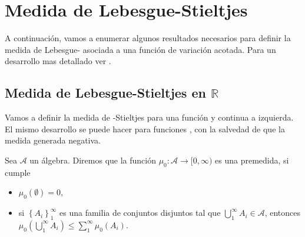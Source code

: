 \section{Medida de Lebesgue-Stieltjes}
A continuación, vamos a enumerar algunos resultados necesarios para definir la medida de Lebesgue- asociada a una función de variación acotada. Para un desarrollo mas detallado ver \cite{folland}.
\subsection{Medida de Lebesgue-Stieltjes en $\mathbb{R}$}
 
Vamos a definir la medida de -Stieltjes para una función  y continua a izquierda. El mismo desarrollo se puede hacer para funciones , con la salvedad de que la medida generada  negativa.


\begin{defi}\label{def:premedida}
Sea $\mathcal{A}$ un álgebra. Diremos que la función $\mu_0:\mathcal{A}\to [0,\infty)$ es una premedida, si cumple 
 
 
\begin{itemize}
    \item $\mu_0(\emptyset)=0,$
    \item si $\displaystyle\left\{A_i\right\}_1^\infty$ es una familia de conjuntos disjuntos tal que $\displaystyle\bigcup_1^\infty A_i\in \mathcal{A}$, entonces $\displaystyle\mu_0\left(\bigcup_1^\infty A_i\right)\leq \sum_1^\infty \mu_0\left(A_i\right).$ 
\end{itemize}

\end{defi}




